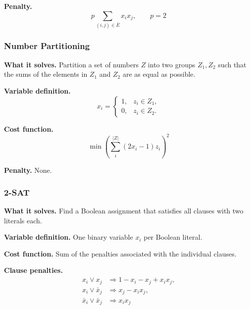 \highspace
\textcolor{Red2}{ \textbf{Penalty.}}
\begin{equation}\label{eq:qubo-max-clique-penalty}
    p\sum_{(i,j)\in\bar{E}}x_ix_j,
    \qquad p=2
\end{equation}

\newpage

\subsubsection{Number Partitioning}

\textcolor{Green3}{ \textbf{What it solves.}} Partition a set of numbers $Z$ into two groups $Z_1,Z_2$ such that the sums of the elements in $Z_1$ and $Z_2$ are as equal as possible.

\highspace
\textcolor{Green3}{ \textbf{Variable definition.}}
\begin{equation*}
    x_i=
    \begin{cases}
        1, & z_i\in Z_1,\\
        0, & z_i\in Z_2.
    \end{cases}
\end{equation*}

\highspace
\textcolor{Red2}{ \textbf{Cost function.}}
\begin{equation}\label{eq:qubo-number-partitioning}
    \min
    \left(
        \sum_{i}^{|Z|}
        (2x_i-1)z_i
    \right)^2
\end{equation}

\highspace
\textcolor{Red2}{ \textbf{Penalty.}} None.

\longline

\subsubsection{2-SAT}\label{sec:qubo-2-sat}

\textcolor{Green3}{ \textbf{What it solves.}} Find a Boolean assignment that satisfies all clauses with two literals each.

\highspace
\textcolor{Green3}{ \textbf{Variable definition.}} One binary variable $x_i$ per Boolean literal.

\highspace
\textcolor{Red2}{ \textbf{Cost function.}} Sum of the penalties associated with the individual clauses.

\highspace
\textcolor{Red2}{ \textbf{Clause penalties.}}
\begin{equation}\label{eq:qubo-2-sat-penalties}
    \begin{aligned}
        x_i\lor x_j
        &\Rightarrow 1-x_i-x_j+x_ix_j,\\
        x_i\lor \bar{x}_j
        &\Rightarrow x_j-x_ix_j,\\
        \bar{x}_i\lor \bar{x}_j
        &\Rightarrow x_ix_j
    \end{aligned}
\end{equation}

